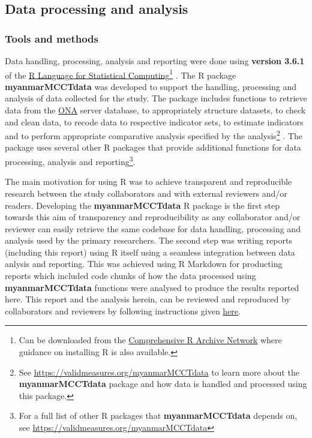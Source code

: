 \documentclass[12pt,a4paper]{article}
\let\rmarkdownfootnote\footnote%
\def\footnote{\protect\rmarkdownfootnote}
\begin{document}
\hypertarget{analysis}{%
\subsection{Data processing and analysis}\label{analysis}}

\hypertarget{processing-tools}{%
\subsubsection{Tools and methods}\label{processing-tools}}

Data handling, processing, analysis and reporting were done using \textbf{version 3.6.1} of the \href{https://cran.r-project.org}{R Language for Statistical Computing}\footnote{Can be downloaded from the \href{https://cran.r-project.org}{Comprehensive R Archive Network} where guidance on installing R is also available.} \citep{R2019}. The R package \textbf{myanmarMCCTdata} was developed to support the handling, processing and analysis of data collected for the study. The package includes functions to retrieve data from the \href{https://ona.io}{ONA} server database, to appropriately structure datasets, to check and clean data, to recode data to respective indicator sets, to estimate indicators and to perform appropriate comparative analysis specified by the analysis\footnote{See \url{https://validmeasures.org/myanmarMCCTdata} to learn more about the \textbf{myanmarMCCTdata} package and how data is handled and processed using this package.} \citep{myanmarData2019}. The package uses several other R packages that provide additional functions for data processing, analysis and reporting\footnote{For a full list of other R packages that \textbf{myanmarMCCTdata} depends on, see \url{https://validmeasures.org/myanmarMCCTdata}}.

The main motivation for using R was to achieve transparent and reproducible research between the study collaborators and with external reviewers and/or readers. Developing the \textbf{myanmarMCCTdata} R package is the first step towards this aim of transparency and reproducibility as any collaborator and/or reviewer can easily retrieve the same codebase for data handling, processing and analysis used by the primary researchers. The second step was writing reports (including this report) using R itself using a seamless integration between data anlysis and reporting. This was achieved using R Markdown \citep{rmarkdown2018} for producting reports which included code chunks of how the data processed using \textbf{myanmarMCCTdata} functions were analysed to produce the results reported here. This report and the analysis herein, can be reviewed and reproduced by collaborators and reviewers by following instructions given \href{https://github.com/validmeasures/myanmarMCCTkayah}{here}.
\end{document}
